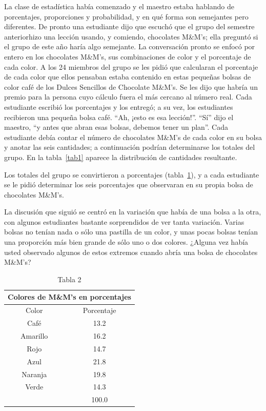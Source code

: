 \documentclass[letterpaper,10pt,twoside]{article}
\begin{document}
La clase de estadística había comenzado y el maestro estaba hablando de porcentajes, proporciones y probabilidad, y en qué forma son semejantes pero diferentes. De pronto una estudiante dijo que escuchó que el grupo del semestre anteriorhizo una lección usando, y comiendo, chocolates M\&M’s; ella preguntó si el grupo
de este año haría algo semejante. La conversación pronto se enfocó por entero en los chocolates M\&M’s, sus combinaciones de color y el porcentaje de cada color. A los 24 miembros del grupo se les pidió que calcularan el porcentaje de cada color que ellos pensaban estaba contenido en estas pequeñas bolsas de color café de los
Dulces Sencillos de Chocolate M\&M’s. Se les dijo que habría un premio para la persona cuyo cálculo fuera el más cercano al número real. Cada estudiante escribió los porcentajes y los entregó; a su vez, los estudiantes recibieron una pequeña bolsa café. “Ah, ¡esto es esa lección!”. “Sí” dijo el maestro, “y antes que abran esas
bolsas, debemos tener un plan”. Cada estudiante debía contar el número de chocolates M\&M's de cada color en su bolsa y anotar las seis cantidades; a continuación podrían determinarse los totales del grupo. En la tabla~\ref{tab1} aparece la distribución de cantidades resultante.

Los totales del grupo se convirtieron a porcentajes (tabla~\ref{tab2}), y a cada estudiante se le pidió determinar los seis porcentajes que observaran en su propia bolsa de chocolates M\&M's.

La discusión que siguió se centró en la variación que había de una bolsa a la
otra, con algunos estudiantes bastante sorprendidos de ver tanta variación. Varias
bolsas no tenían nada o sólo una pastilla de un color, y unas pocas bolsas tenían una
proporción más bien grande de sólo uno o dos colores. ¿Alguna vez había usted observado algunos de estos extremos cuando abría una bolsa de chocolates M\&M's?
\begin{table}[h!]
\centering
\begin{tabular}{cc}
\multicolumn{2}{c}{Colores de M\&M's en porcentajes} \\ 
\hline 
Color & Porcentaje \\ 
\hline 
Café & 13.2 \\ 
Amarillo & 16.2 \\ 
Rojo & 14.7 \\ 
Azul & 21.8 \\ 
Naranja & 19.8 \\ 
Verde & 14.3 \\ \cline{2-2} 
 & 100.0 \\ 
\hline 
\end{tabular} 
\caption{Tabla 2} \label{tab2}
\end{table}
\end{document}
